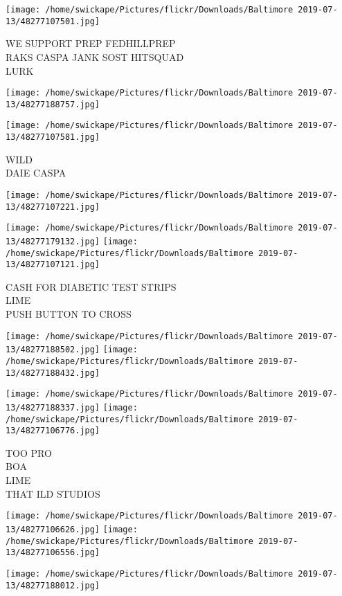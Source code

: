 \documentclass[10pt,letterpaper]{article}
\begin{document}
\vspace{0.25in}
\texttt{[image: /home/swickape/Pictures/flickr/Downloads/Baltimore 2019-07-13/48277107501.jpg]}

WE SUPPORT PREP FEDHILLPREP\\
RAKS CASPA JANK SOST HITSQUAD\\
LURK
\pagebreak

\texttt{[image: /home/swickape/Pictures/flickr/Downloads/Baltimore 2019-07-13/48277188757.jpg]}

\vspace{0.25in}
\texttt{[image: /home/swickape/Pictures/flickr/Downloads/Baltimore 2019-07-13/48277107581.jpg]}

WILD\\
DAIE CASPA
\pagebreak

\texttt{[image: /home/swickape/Pictures/flickr/Downloads/Baltimore 2019-07-13/48277107221.jpg]}

\vspace{0.25in}
\texttt{[image: /home/swickape/Pictures/flickr/Downloads/Baltimore 2019-07-13/48277179132.jpg]}
\texttt{[image: /home/swickape/Pictures/flickr/Downloads/Baltimore 2019-07-13/48277107121.jpg]}

CASH FOR DIABETIC TEST STRIPS\\
LIME\\
PUSH BUTTON TO CROSS
\pagebreak

\texttt{[image: /home/swickape/Pictures/flickr/Downloads/Baltimore 2019-07-13/48277188502.jpg]}
\texttt{[image: /home/swickape/Pictures/flickr/Downloads/Baltimore 2019-07-13/48277188432.jpg]}

\texttt{[image: /home/swickape/Pictures/flickr/Downloads/Baltimore 2019-07-13/48277188337.jpg]}
\texttt{[image: /home/swickape/Pictures/flickr/Downloads/Baltimore 2019-07-13/48277106776.jpg]}

TOO PRO\\
BOA\\
LIME\\
THAT ILD STUDIOS
\pagebreak

\texttt{[image: /home/swickape/Pictures/flickr/Downloads/Baltimore 2019-07-13/48277106626.jpg]}
\texttt{[image: /home/swickape/Pictures/flickr/Downloads/Baltimore 2019-07-13/48277106556.jpg]}

\vspace{0.25in}
\texttt{[image: /home/swickape/Pictures/flickr/Downloads/Baltimore 2019-07-13/48277188012.jpg]}
\end{document}

